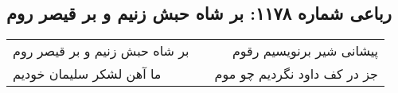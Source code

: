 \begin{center}
\section*{رباعی شماره ۱۱۷۸: بر شاه حبش زنیم و بر قیصر روم}
\label{sec:1178}
\begin{longtable}{l p{0.5cm} r}
بر شاه حبش زنیم و بر قیصر روم
&&
پیشانی شیر برنویسیم رقوم
\\
ما آهن لشکر سلیمان خودیم
&&
جز در کف داود نگردیم چو موم
\\
\end{longtable}
\end{center}
